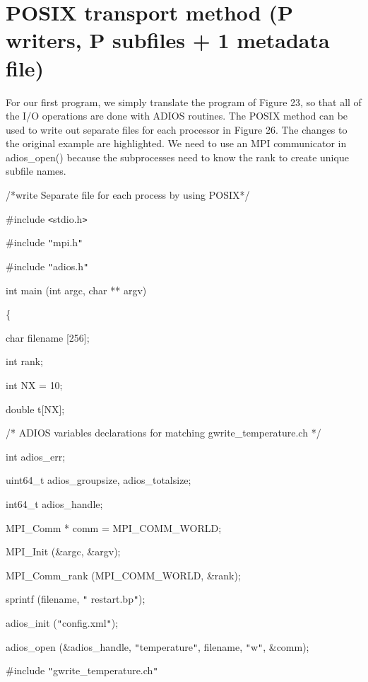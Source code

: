 \section{POSIX transport method (P writers, P subfiles + 1 metadata file)}

For our first program, we simply translate the program of Figure 23, so that all 
of the I/O operations are done with ADIOS routines. The POSIX method can be used 
to write out separate files for each processor in Figure 26. The changes to the 
original example are highlighted. We need to use an MPI communicator in adios\_open() 
because the subprocesses need to know the rank to create unique subfile names. 

/*write Separate file for each process by using POSIX*/

\#include \texttt{<}stdio.h\texttt{>}

\#include \texttt{"}mpi.h\texttt{"}

{\color{color02} \#include \texttt{"}adios.h\texttt{"}}

int main (int argc, char ** argv) 

\{

\leftskip=18pt
char      \textbf{    } filename [256];

int              rank;

int              NX\textbf{ }=\textbf{ }10;

double      t[NX];

/* ADIOS variables declarations for matching gwrite\_temperature.ch */

{\color{color02} int                  adios\_err;}

{\color{color02} uint64\_t       adios\_groupsize, adios\_totalsize;}

{\color{color02} int64\_t          adios\_handle;}

{\color{color02} MPI\_Comm  * comm =  MPI\_COMM\_WORLD;}

MPI\_Init (\&argc, \&argv);

MPI\_Comm\_rank (MPI\_COMM\_WORLD, \&rank);

sprintf (filename, \texttt{"}{\color{color02} restart.bp}\texttt{"});

{\color{color02} adios\_init (\texttt{"}config.xml\texttt{"});}

{\color{color02} adios\_open (\&adios\_handle, \texttt{"}temperature\texttt{"}, 
filename, \texttt{"}w\texttt{"}, \&comm);}

{\color{color02} \#include \texttt{"}gwrite\_temperature.ch\texttt{"}}

